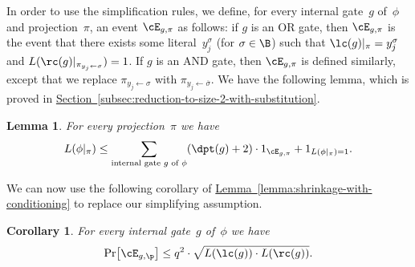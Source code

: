 \documentclass[11pt]{article}
\numberwithin{equation}{section}
\newtheorem{lemma}[theorem]{Lemma}
\newtheorem{corollary}[theorem]{Corollary}
\theoremstyle{definition}
\theoremstyle{plain}
\newcommand{\expref}[2]{\hyperref[#2]{#1~\ref{#2}}}
\theoremstyle{definition}\newtheorem{notation}[theorem]{Notation}\theoremstyle{plain}
\begin{document}
In order to use the simplification rules, we define, for every internal
gate~$g$ of~$\phi$ and projection~$\pi$, an event $\cE_{g,\pi}$
as follows: if $g$ is an OR gate, then $\cE_{g,\pi}$ is the event
that there exists some literal~$y_{j}^{\sigma}$ (for $\sigma\in\B$)
such that $\lc(g)|_{\pi}=y_{j}^{\sigma}$ and $L(\rc(g)|_{\pi_{y_{j}\gets\sigma}})=1$.
If $g$ is an AND gate, then $\cE_{g,\pi}$ is defined similarly,
except that we replace $\pi_{y_{j}\gets\sigma}$ with $\pi_{y_{j}\gets\overline{\sigma}}$.
We have the following lemma, which is proved in \expref{Section}{subsec:reduction-to-size-2-with-substitution}. 
\begin{lemma}
\label{lemma:reduction-to-size-2-with-substitution}For every projection~$\pi$
we have 
\[
L(\phi|_{\pi})\le\sum_{\text{internal gate \ensuremath{g} of \ensuremath{\phi}}}(\dpt(g)+2)\cdot1_{\cE_{g,\pi}}+1_{L(\phi|_{\pi})=1}.
\]
\end{lemma}

We can now use the following corollary of \expref{Lemma}{lemma:shrinkage-with-conditioning}
to replace our simplifying assumption. 
\begin{corollary}
\label{cor:shrinkage-to-two-literals}For every internal gate~$g$ of~$\phi$
we have 
\[
\Pr\!\left[\cE_{g,\p}\right]\le q^{2}\cdot\sqrt{L(\lc(g))\cdot L(\rc(g))}.
\]
\end{corollary}
\end{document}

